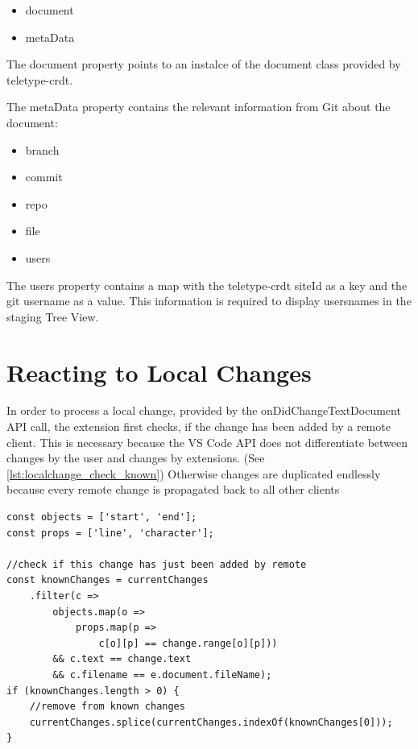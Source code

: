 \begin{itemize}
    \item document
    \item metaData
\end{itemize}

The document property points to an instalce of the document class provided by teletype-crdt.

The metaData property contains the relevant information from Git about the document:
\begin{itemize}
    \item branch
    \item commit
    \item repo
    \item file
    \item users
\end{itemize}

The users property contains a map with the teletype-crdt siteId as a key and the git username as a value.
This information is required to display usersnames in the staging Tree View.

\section{Reacting to Local Changes}

In order to process a local change, provided by the onDidChangeTextDocument API call, the extension first checks, if the change has been added by a remote client. This is necessary because the VS Code API does not differentiate between changes by the user and changes by extensions. (See \ref{lst:localchange_check_known}) Otherwise changes are duplicated endlessly because every remote change is propagated back to all other clients

\begin{lstlisting}[label={lst:localchange_check_known}, caption=Is this change already known to the data model? ]
const objects = ['start', 'end'];
const props = ['line', 'character'];

//check if this change has just been added by remote
const knownChanges = currentChanges
    .filter(c => 
        objects.map(o => 
            props.map(p => 
                c[o][p] == change.range[o][p])) 
        && c.text == change.text 
        && c.filename == e.document.fileName);
if (knownChanges.length > 0) {
    //remove from known changes
    currentChanges.splice(currentChanges.indexOf(knownChanges[0]));
}
\end{lstlisting}